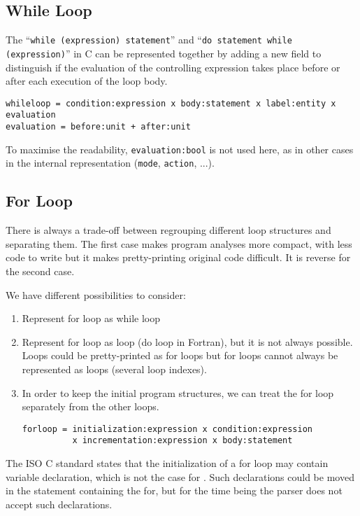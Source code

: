 \documentclass[a4paper]{report}
\begin{document}
\subsection{While Loop}

The ``\lstinline/while (expression) statement/'' and 
``\lstinline/do statement while (expression)/'' in C can be represented together
 by adding a new field to distinguish
if the evaluation of the
controlling expression takes place before or after each execution of the
loop body.   

\begin{verbatim}
whileloop = condition:expression x body:statement x label:entity x evaluation
evaluation = before:unit + after:unit
\end{verbatim}
To maximise the readability, \verb|evaluation:bool| is not used here,
as in other cases in the internal representation (\verb/mode/,
\verb/action/, ...).

\subsection{For Loop}

There is always a trade-off between regrouping different loop structures
and separating them. The first case makes program analyses more compact,
with less code to write but it makes pretty-printing original code
difficult. It is reverse for the second case. 

We have different possibilities to consider:
\begin{enumerate}
\item Represent for loop as while loop
\item Represent for loop as loop (do loop in Fortran), but it is not always
  possible. Loops could be pretty-printed as for loops but for loops cannot
  always be represented as loops (several loop indexes).
\item In order to keep the initial program structures, we can treat the for loop
separately from the other loops. 

\begin{verbatim}
forloop = initialization:expression x condition:expression
          x incrementation:expression x body:statement
\end{verbatim}
\end{enumerate}

The ISO C standard \cite{ISOC} states that the initialization of a for
loop may contain variable declaration, which is not the case for
\cite{Kern78}. Such declarations could be moved in the statement
containing the for, but for the time being the parser does not accept
such declarations.
\end{document}
